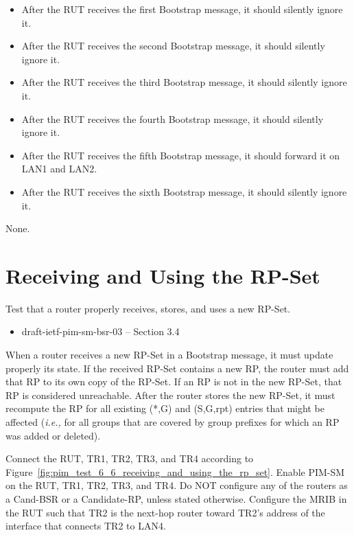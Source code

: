\documentclass[11pt]{report}
\newcommand{\ie}{\emph{i.e.,}\xspace}
\begin{document}
\begin{itemize}

  \item After the RUT receives the first Bootstrap message, it should silently
  ignore it.

  \item After the RUT receives the second Bootstrap message, it should silently
  ignore it.

  \item After the RUT receives the third Bootstrap message, it should silently
  ignore it.

  \item After the RUT receives the fourth Bootstrap message, it should silently
  ignore it.

  \item After the RUT receives the fifth Bootstrap message, it should forward
  it on LAN1 and LAN2.

  \item After the RUT receives the sixth Bootstrap message, it should silently
  ignore it.

\end{itemize}

None.

\newpage
\section{Receiving and Using the RP-Set}

Test that a router properly receives, stores, and uses a new RP-Set.


\begin{itemize}
  \item draft-ietf-pim-sm-bsr-03 -- Section 3.4
\end{itemize}

When a router receives a new RP-Set in a Bootstrap message, it must update
properly its state. If the received RP-Set contains a new RP, the router must
add that RP to its own copy of the RP-Set. If an RP is not in the new RP-Set,
that RP is considered unreachable. After the router stores the new RP-Set, it
must recompute the RP for all existing (*,G) and (S,G,rpt) entries that might
be affected (\ie for all groups that are covered by group prefixes for which
an RP was added or deleted).

Connect the RUT, TR1, TR2, TR3, and TR4 according to
Figure~\ref{fig:pim_test_6_6_receiving_and_using_the_rp_set}.
Enable PIM-SM on the RUT, TR1, TR2, TR3, and TR4.
Do NOT configure any of the routers as a Cand-BSR or a Candidate-RP,
unless stated otherwise.
Configure the MRIB in the RUT such that TR2 is the next-hop router toward
TR2's address of the interface that connects TR2 to LAN4.
\end{document}
